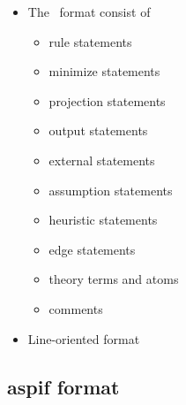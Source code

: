 \begin{frame}
  \begin{itemize}
  \item The \aspif\ format consist of
    \begin{itemize}
    \item rule statements
    \item minimize statements
    \item projection statements
    \item output statements
    \item external statements
    \item assumption statements
    \item heuristic statements
    \item edge statements
    \item theory terms and atoms
    \item comments
    \end{itemize}
  \item Line-oriented format
  \end{itemize}
\end{frame}
\subsection{aspif format}
%
